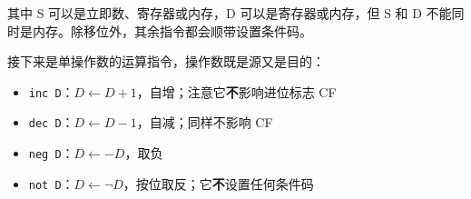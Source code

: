 其中 S 可以是立即数、寄存器或内存，D 可以是寄存器或内存，但 S 和 D 不能同时是内存。除移位外，其余指令都会顺带设置条件码。

接下来是单操作数的运算指令，操作数既是源又是目的：

\begin{itemize}
    \item \texttt{inc D}：$D \leftarrow D + 1$，自增；注意它\textbf{不}影响进位标志 CF
    \item \texttt{dec D}：$D \leftarrow D - 1$，自减；同样不影响 CF
    \item \texttt{neg D}：$D \leftarrow -D$，取负
    \item \texttt{not D}：$D \leftarrow \neg D$，按位取反；它\textbf{不}设置任何条件码
\end{itemize}

